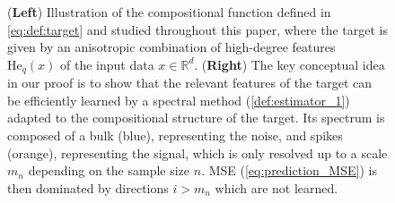 \documentclass[]{article}
\numberwithin{equation}{section}
\theoremstyle{definition}
\newcommand{\He}{\mathord{\mathrm{He}}}
\begin{document}
\begin{figure}[t]
\begin{minipage}{0.45\textwidth}
    \end{minipage}
    \caption{(\textbf{Left}) Illustration of the compositional function defined in \cref{eq:def:target} and studied throughout this paper, where the target is given by an anisotropic combination of high-degree features $\He_{q}(x)$ of the input data $x\in\mathbb{R}^{d}$. (\textbf{Right}) The key conceptual idea in our proof is to show that the relevant features of the target can be efficiently learned by a spectral method (\cref{def:estimator_1}) adapted to the compositional structure of the target. Its spectrum is composed of a bulk (blue), representing the noise, and spikes (orange), representing the signal, which is only resolved up to a scale $m_{n}$ depending on the sample size $n$. MSE (\cref{eq:prediction_MSE}) is then dominated by directions $i>m_{n}$ which are not learned.}
    \label{fig:illustration}
\end{figure}
\end{document}
